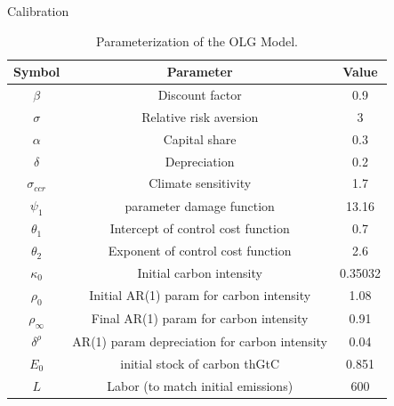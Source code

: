 \documentclass[aspectratio=169,11pt]{beamer}
\begin{document}
\begin{frame}[fragile]{Calibration}
\vspace{-0.2em}
\begin{table}[]
    \centering
    \footnotesize
    \begin{tabular}{ccc}
    \hline \hline
  \textbf{Symbol} & \textbf{Parameter} & \textbf{Value} \\
    \hline
    $\beta$  & Discount factor& 0.9 \\
    $\sigma$  & Relative risk aversion & 3 \\
    $\alpha$  & Capital share & 0.3 \\
    $\delta$  &Depreciation & 0.2 \\
    $\sigma_{ccr}$  & Climate sensitivity & 1.7 \\
    $\psi_1$  & parameter damage function & 13.16 \\
    $\theta_1$  & Intercept of control cost function & 0.7 \\
    $\theta_2$  & Exponent of control cost function & 2.6 \\
    $\kappa_{0}$  & Initial carbon intensity & 0.35032 \\
    $\rho_0$  & Initial AR(1) param for carbon intensity & 1.08 \\
    $\rho_{\infty}$  & Final AR(1) param for carbon intensity & 0.91 \\
    $\delta^{\rho}$  & AR(1) param depreciation for carbon intensity  & 0.04 \\
    $E_0$ & initial stock of carbon thGtC& 0.851 \\
    $L$ & Labor (to match initial emissions) & 600 \\
    \hline
\end{tabular}
    \caption{Parameterization of the OLG Model.}
    \label{tab:parameters}
\end{table}
\end{frame}
\end{document}
